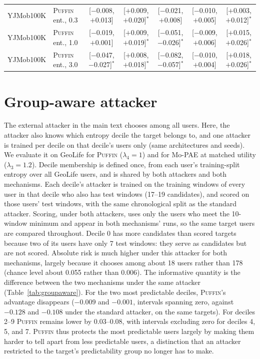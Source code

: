 \documentclass[sigconf,anonymous,review]{acmart}
\newcommand{\puffin}{\textsc{Puffin}}
\begin{document}
\begin{table}[!htbp]
\begin{tabular}{@{}llccccc@{}}
YJMob100K & \puffin{} ent., 0.3 & [$-$0.008, $+$0.013] & [$+$0.009, $+$0.020]$^*$ & [$-$0.021, $+$0.008] & [$-$0.010, $+$0.005] & [$+$0.003, $+$0.012]$^*$ \\
YJMob100K & \puffin{} ent., 1.0 & [$-$0.019, $+$0.001] & [$+$0.009, $+$0.019]$^*$ & [$-$0.051, $-$0.026]$^*$ & [$-$0.009, $+$0.006] & [$+$0.015, $+$0.026]$^*$ \\
YJMob100K & \puffin{} ent., 3.0 & [$-$0.047, $-$0.027]$^*$ & [$+$0.008, $+$0.018]$^*$ & [$-$0.082, $-$0.057]$^*$ & [$-$0.010, $+$0.004] & [$+$0.018, $+$0.026]$^*$ \\
\bottomrule
\end{tabular}
\end{table}

\clearpage
\section{Group-aware attacker}
\label{app:groupaware}
The external attacker in the main text chooses among all users. Here, the attacker also knows which entropy decile the target belongs to, and one attacker is trained per decile on that decile's users only (same architectures and seeds). We evaluate it on GeoLife for \puffin{} ($\lambda_4=1$) and for Mo-PAE at matched utility ($\lambda_3=1.2$). Decile membership is defined once, from each user's training-split entropy over all GeoLife users, and is shared by both attackers and both mechanisms. Each decile's attacker is trained on the training windows of every user in that decile who also has test windows (17--19 candidates), and scored on those users' test windows, with the same chronological split as the standard attacker. Scoring, under both attackers, uses only the users who meet the 10-window minimum and appear in both mechanisms' runs, so the same target users are compared throughout. Decile 0 has more candidates than scored targets because two of its users have only 7 test windows: they serve as candidates but are not scored. Absolute risk is much higher under this attacker for both mechanisms, largely because it chooses among about 18 users rather than 178 (chance level about 0.055 rather than 0.006). The informative quantity is the difference between the two mechanisms under the same attacker (Table~\ref{tab:groupaware}). For the two most predictable deciles, \puffin's advantage disappears ($-0.009$ and $-0.001$, intervals spanning zero, against $-0.128$ and $-0.108$ under the standard attacker, on the same targets). For deciles 2--9 \puffin{} remains lower by 0.03--0.08, with intervals excluding zero for deciles 4, 5, and 7. \puffin{} thus protects the most predictable users largely by making them harder to tell apart from less predictable users, a distinction that an attacker restricted to the target's predictability group no longer has to make.
\end{document}

